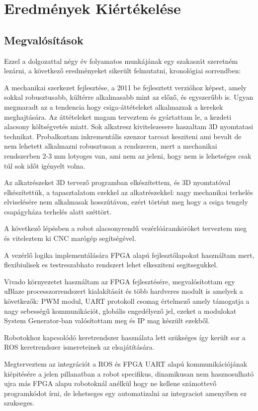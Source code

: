 \chapter{Eredmények Kiértékelése}
\section{Megvalósítások}
Ezzel a dolgozattal négy év folyamatos munkájának egy szakaszát szeretném lezárni, a következő eredményeket sikerült felmutatni, kronológiai sorrendben: 

A mechanikai szerkezet fejlesztése, a 2011 be fejlesztett verzióhoz képest, amely sokkal robusztusabb, kültérre alkalmasabb mint az előző, és egyszerűbb is. Ugyan megmaradt az a tendencia hogy csiga-áttételeket alkalmazzak a kerekek meghajtására. Az áttételeket magam terveztem és gyártattam le, a kezdeti alacsony költségvetés miatt. 
Sok alkatresz kivitelezesere haszaltam 3D nyomtatasi technikat. Probalkoztam inkrementális szenzor tarcsat kesziteni ami bevalt de nem lehetett alkalmazni robusztusan a rendszeren, mert a mechanikai rendszerben 2-3 mm lotyoges van, ami nem az jeleni, hogy nem is lehetséges csak túl sok időt igényelt volna.

Az alkatrészeket 3D tervező programban elkészítettem, és 3D nyomtatóval elkészítettük, a tapasztalatom ezekkel az alkatrészekkel: nagy mechanikai terhelés elviselésére nem alkalmasak hosszútávon, ezért történt meg hogy a csiga tengely csapágyháza terhelés alatt széttört.

A következő lépésben a robot alacsonyrendű vezérlóáramköröket terveztem meg és viteleztem ki CNC marógép segítségével.

A vezérlő logika implementálására FPGA alapú fejlesztőlapokat használtam mert, flexibiulisek es testreszabhato rendszert lehet elkesziteni segitsegukkel.

Vivado környezetet használtam az FPGA fejlesztésére, megvalósítottam egy uBlaze processzorrendszert kialakítását és több hardveres modult is amelyek a következők: PWM modul, UART protokoll csomag értelmező amely támogatja a nagy sebességű kommunikációt, globális engedélyező jel, ezeket a modulokat System Generator-ban valósítottam meg és IP mag készült ezekből.

Robotokhoz kapcsolódó keretrendszer használata lett szükséges így került sor a ROS keretrendszer ismereteinek az elsajátítására.

Megterveztem az integrációt a ROS és FPGA UART alapú kommunikációjának kiépitésére a jelen pillanatban a robot specifikus, dinamikusan nem hasznosulható ujra más FPGA alapu robotoknál anélkül hogy ne kellene számottevő programkódot írni, de lehetseges egy automatizalni az integraciot amenyiben ez szukseges.

